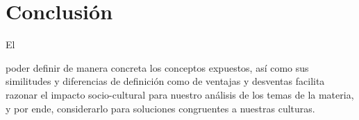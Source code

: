 \documentclass[stu, 12pt, letterpaper, donotrepeattitle, floatsintext, natbib]{apa7}
\begin{document}
\section*{Conclusión}
El \begin{justifying}
\end{justifying}
poder definir de manera concreta los conceptos expuestos, así como sus similitudes y diferencias de definición como de ventajas y desventas facilita razonar
el impacto socio-cultural para nuestro análisis de los temas de la materia, y por ende, considerarlo para soluciones congruentes a nuestras culturas.\par
\newpage
\setcounter{secnumdepth}{0} %
\renewcommand\refname{\textbf{Referencias}}
\end{document}
